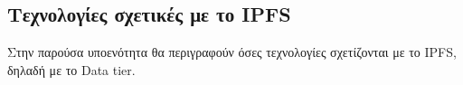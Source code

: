 \subsection{Τεχνολογίες σχετικές με το IPFS}

Στην παρούσα υποενότητα θα περιγραφούν όσες τεχνολογίες σχετίζονται με το IPFS, δηλαδή με το Data tier.



